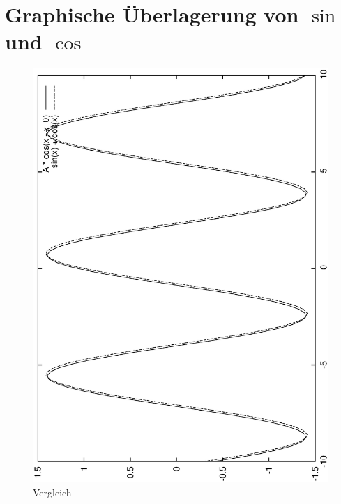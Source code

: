 \section{Graphische Überlagerung von $\sin$ und $\cos$}



\begin{figure}[h!]
  \begin{center}
    \includegraphics{grafiken/vergleich}
  \end{center}
  \caption{Vergleich}
  \label{fig:vergleich}
\end{figure}


